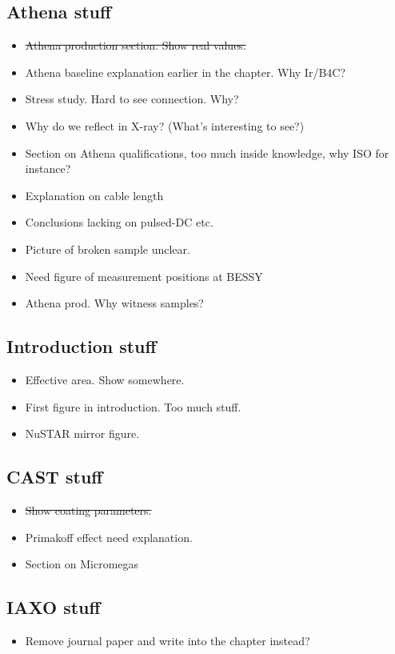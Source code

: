 \subsection{Athena stuff}
\begin{itemize}

	\item \st{ Athena production section. Show real values.}
	\item Athena baseline explanation earlier in the chapter. Why Ir/B4C?
	\item Stress study. Hard to see connection. Why?


	\item Why do we reflect in X-ray? (What's interesting to see?)
	\item Section on Athena qualifications, too much inside knowledge, why ISO for instance?

	\item Explanation on cable length
	\item Conclusions lacking on pulsed-DC etc.
	\item Picture of broken sample unclear.
	\item Need figure of measurement positions at BESSY
	\item Athena prod. Why witness samples?

\end{itemize}

\subsection{Introduction stuff}
\begin{itemize}
  \item Effective area. Show somewhere.
  \item First figure in introduction. Too much stuff.
  \item NuSTAR mirror figure.
\end{itemize}


\subsection{CAST stuff}
\begin{itemize}
  \item \st{ Show coating parameters.}
  \item Primakoff effect need explanation.
  \item Section on Micromegas
\end{itemize}

\subsection{IAXO stuff}
\begin{itemize}
  \item Remove journal paper and write into the chapter instead?
\end{itemize}
